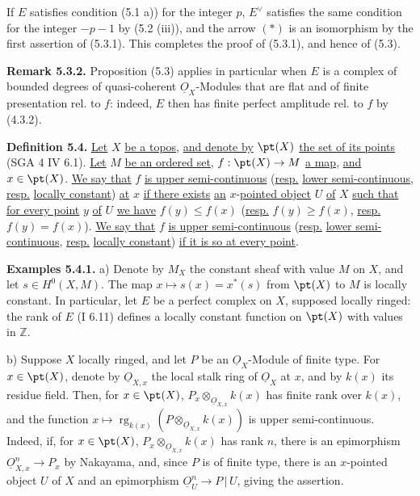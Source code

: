 %
If \(E\) satisfies condition (5.1 a)) for the integer \(p\), \(E^{\vee}\) satisfies the same condition for the integer \(-p-1\) by (5.2 (iii)), and the arrow \((*)\) is an isomorphism by the first assertion of (5.3.1). This completes the proof of (5.3.1), and hence of (5.3).

\textbf{Remark 5.3.2.} Proposition (5.3) applies in particular when \(E\) is a complex of bounded degrees of quasi-coherent \(\underline{O}_X\)-Modules that are flat and of finite presentation rel. to \(f\): indeed, \(E\) then has finite perfect amplitude rel. to \(f\) by (4.3.2).

%
\textbf{Definition 5.4.} \uline{Let} \(X\) \uline{be a topos}, \uline{and denote by} \(\pt(X)\) \uline{the set of its points} (SGA 4 IV 6.1). \uline{Let} \(M\) \uline{be an ordered set}, \(f:\pt(X)\to M\) \uline{a map}, \uline{and} \(x\in\pt(X)\). \uline{We say that} \(f\) \uline{is upper semi-continuous} (\uline{resp.} \uline{lower semi-continuous}, \uline{resp.} \uline{locally constant}) \uline{at} \(x\) \uline{if there exists} \uline{an} \(x\)-\uline{pointed object} \(U\) \uline{of} \(X\) \uline{such that for every point} \(y\) \uline{of} \(U\) \uline{we have} \(f(y)\leq f(x)\) (\uline{resp.} \(f(y)\geq f(x)\), \uline{resp.} \(f(y)=f(x)\)). \uline{We say that} \(f\) \uline{is upper semi-continuous} (\uline{resp.} \uline{lower semi-continuous}, \uline{resp.} \uline{locally constant}) \uline{if it is so at every point}.

\textbf{Examples 5.4.1.} a) Denote by \(M_X\) the constant sheaf with value \(M\) on \(X\), and let \(s\in H^0(X,M)\). The map \(x\mapsto s(x)=x^*(s)\) from \(\pt(X)\) to \(M\) is locally constant. In particular, let \(E\) be a perfect complex on \(X\), supposed locally ringed: the rank of \(E\) (I 6.11) defines a locally constant function on \(\pt(X)\) with values in \(\mathbb Z\).

b) Suppose \(X\) locally ringed, and let \(P\) be an \(\underline{O}_X\)-Module of finite type. For \(x\in\pt(X)\), denote by \(\underline{O}_{X,x}\) the local stalk ring of \(\underline{O}_X\) at \(x\), and by \(k(x)\) its residue field. Then, for \(x\in\pt(X)\), \(P_x\otimes_{\underline{O}_{X,x}}k(x)\) has finite rank over \(k(x)\), and the function \(x\mapsto\operatorname{rg}_{k(x)}(P\otimes_{\underline{O}_{X,x}}k(x))\) is upper semi-continuous. Indeed, if, for \(x\in\pt(X)\), \(P_x\otimes_{\underline{O}_{X,x}}k(x)\) has rank \(n\), there is an epimorphism \(\underline{O}_{X,x}^n\to P_x\) by Nakayama, and, since \(P\) is of finite type, there is an \(x\)-pointed object \(U\) of \(X\) and an epimorphism \(\underline{O}_U^n\to P\,|\,U\), giving the assertion.

